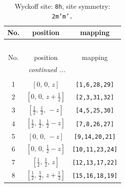 \documentclass[fleqn,8pt]{jsarticle}
\begin{document}
\begin{longtable}{ccc}
\caption{Wyckoff site: {\tt 8h}, site symmetry: {\tt 2m'm'.}}
 \\
 \hline \hline
No. & position & mapping \\ \hline \endfirsthead

\multicolumn{2}{l}{\tablename\ \thetable{}} \\
 \hline \hline
No. & position & mapping \\ \hline \endhead

 \hline \hline
\multicolumn{2}{r}{\footnotesize\it continued ...} \\ \endfoot

 \hline \hline
\multicolumn{2}{r}{} \\ \endlastfoot

1 & $\left[ 0,\, 0,\, z \right]$ & {\tt [1,6,28,29]} \\ \hline
2 & $\left[ 0,\, 0,\, z + \frac{1}{2} \right]$ & {\tt [2,3,31,32]} \\ \hline
3 & $\left[ \frac{1}{2},\, \frac{1}{2},\, - z \right]$ & {\tt [4,5,25,30]} \\ \hline
4 & $\left[ \frac{1}{2},\, \frac{1}{2},\, \frac{1}{2} - z \right]$ & {\tt [7,8,26,27]} \\ \hline
5 & $\left[ 0,\, 0,\, - z \right]$ & {\tt [9,14,20,21]} \\ \hline
6 & $\left[ 0,\, 0,\, \frac{1}{2} - z \right]$ & {\tt [10,11,23,24]} \\ \hline
7 & $\left[ \frac{1}{2},\, \frac{1}{2},\, z \right]$ & {\tt [12,13,17,22]} \\ \hline
8 & $\left[ \frac{1}{2},\, \frac{1}{2},\, z + \frac{1}{2} \right]$ & {\tt [15,16,18,19]} \\
\end{longtable}
\renewcommand{\arraystretch}{1.2}
\end{document}
